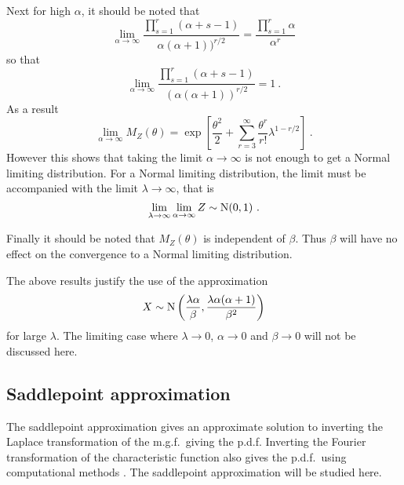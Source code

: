 Next for high $\alpha$, it should be noted that
\begin{equation}
  \lim_{\alpha\rightarrow\infty}
  \frac{
    \prod_{s=1}^r(\alpha+s-1)
  }
  {
    \alpha(\alpha+1))^{r/2}
  }
  =
  \frac{
    \prod_{s=1}^r\alpha
  }
  {
    \alpha^{r}
  }
\end{equation}
so that
\begin{equation}
  \lim_{\alpha\rightarrow\infty}
  \frac{
    \prod_{s=1}^r(\alpha+s-1)
  }
  {
    (\alpha(\alpha+1))^{r/2}
  }
  = 1
  \ .
\end{equation}
As a result
\begin{equation}
  \lim_{\alpha\rightarrow\infty}
  M_Z(\theta)=
  \exp\left[
    \frac{\theta^2}{2}
    +\sum_{r=3}^\infty
    \frac{\theta^r}{r!}
    \lambda^{1-r/2}
  \right]
  \ .
\end{equation}
However this shows that taking the limit $\alpha\rightarrow\infty$ is not enough to get a Normal limiting distribution. For a Normal limiting distribution, the limit must be accompanied with the limit $\lambda\rightarrow\infty$, that is
\begin{equation}
  \lim_{\lambda\rightarrow\infty}\lim_{\alpha\rightarrow\infty}Z\sim\operatorname{N}(0,1)
  \ .
\end{equation}

Finally it should be noted that $M_Z(\theta)$ is independent of $\beta$. Thus $\beta$ will have no effect on the convergence to a Normal limiting distribution.

The above results justify the use of the approximation
\begin{equation}
	X\sim\operatorname{N}\left(\frac{\lambda\alpha}{\beta},\frac{\lambda\alpha(\alpha+1)}{\beta^2}\right)
\end{equation}
for large $\lambda$. The limiting case where $\lambda\rightarrow 0$, $\alpha\rightarrow 0$ and $\beta\rightarrow 0$ will not be discussed here.

\subsection{Saddlepoint approximation}

The saddlepoint approximation \citep{daniels1954saddlepoint} gives an approximate solution to inverting the Laplace transformation of the m.g.f.~giving the p.d.f. Inverting the Fourier transformation of the characteristic function also gives the p.d.f.~using computational methods \citep{dunn2008evaluation}. The saddlepoint approximation will be studied here.

